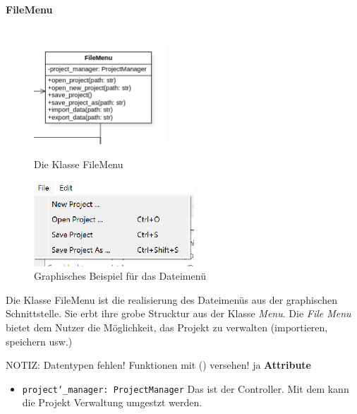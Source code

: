 \documentclass{article}
\begin{document}
\newpage
\textbf{\large{FileMenu}}\\\\
\begin{figure}[H]%
    \centering
    \begin{minipage}[b]{0.4\textwidth}
        \includegraphics[width=5cm]{entwurf/Entwurf_dokument/img/Alissa/FileMenu.png}
        \caption{Die Klasse FileMenu}
    \end{minipage}
    \hfill
    \begin{minipage}[b]{0.4\textwidth}
        \includegraphics[width=6cm]{entwurf/Entwurf_dokument/img/Alissa/EditMenuGUI.png} %
    \caption{Graphisches Beispiel für das Dateimenü}
    \end{minipage}
\end{figure}
Die Klasse FileMenu ist die realisierung des Dateimenüs aus der graphischen Schnittstelle. Sie erbt ihre grobe Strucktur aus der Klasse \textit{Menu}. Die \textit{File Menu} bietet dem Nutzer die Möglichkeit, das Projekt zu verwalten (importieren, speichern usw.)
\newline \newline

NOTIZ: Datentypen fehlen! Funktionen mit () versehen! ja
\textbf{{Attribute}}
\begin{itemize}
\item \texttt{project\char`_manager: ProjectManager} \newline Das ist der Controller. Mit dem kann die Projekt Verwaltung umgestzt werden.
\end{itemize}
\end{document}
